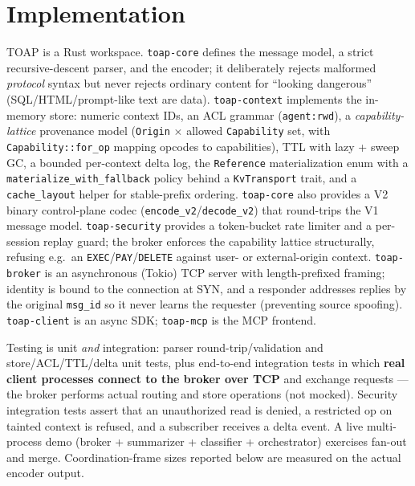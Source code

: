 \documentclass[11pt]{article}
\begin{document}
\section{Implementation}\label{sec:impl}
TOAP is a Rust workspace. \texttt{toap-core} defines the message model, a strict recursive-descent
parser, and the encoder; it deliberately rejects malformed \emph{protocol} syntax but never rejects
ordinary content for ``looking dangerous'' (SQL/HTML/prompt-like text are data). \texttt{toap-context}
implements the in-memory store: numeric context IDs, an ACL grammar (\texttt{agent:rwd}), a
\emph{capability-lattice} provenance model (\texttt{Origin} $\times$ allowed \texttt{Capability} set,
with \texttt{Capability::for\_op} mapping opcodes to capabilities), TTL with lazy + sweep GC, a bounded
per-context delta log, the \texttt{Reference} materialization enum with a
\texttt{materialize\_with\_fallback} policy behind a \texttt{KvTransport} trait, and a
\texttt{cache\_layout} helper for stable-prefix ordering. \texttt{toap-core} also provides a V2 binary
control-plane codec (\texttt{encode\_v2}/\texttt{decode\_v2}) that round-trips the V1 message model.
\texttt{toap-security} provides a token-bucket rate limiter and a per-session replay guard; the broker
enforces the capability lattice structurally, refusing e.g.\ an
\texttt{EXEC}/\texttt{PAY}/\texttt{DELETE} against user- or external-origin context. \texttt{toap-broker} is an asynchronous (Tokio) TCP server with length-prefixed
framing; identity is bound to the connection at SYN, and a responder addresses replies by the original
\texttt{msg\_id} so it never learns the requester (preventing source spoofing). \texttt{toap-client}
is an async SDK; \texttt{toap-mcp} is the MCP frontend.

Testing is unit \emph{and} integration: parser round-trip/validation and store/ACL/TTL/delta unit
tests, plus end-to-end integration tests in which \textbf{real client processes connect to the broker
over TCP} and exchange requests --- the broker performs actual routing and store operations (not
mocked). Security integration tests assert that an unauthorized read is denied, a restricted op on
tainted context is refused, and a subscriber receives a delta event. A live multi-process demo
(broker + summarizer + classifier + orchestrator) exercises fan-out and merge. Coordination-frame
sizes reported below are measured on the actual encoder output.
\end{document}
